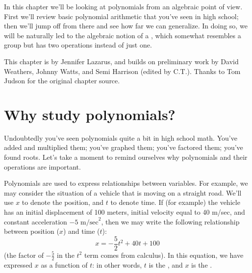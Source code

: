 


 

 In this chapter we'll be looking at  polynomials from an algebraic point of view. First we'll review basic  polynomial arithmetic that you've seen in high school; then we'll jump off from there and see how far we can generalize. In doing so, we will be naturally led to the algebraic notion of a , which somewhat resembles a group but has two operations instead of just one.
\bigskip

This chapter is by Jennifer Lazarus, and builds on preliminary work by David Weathers, Johnny Watts, and Semi Harrison (edited by C.T.). Thanks to Tom Judson for the original chapter source.

\section{Why study polynomials?}
Undoubtedly you've seen polynomials quite a bit in high school math. You've added and multiplied them; you've graphed them; you've factored them; you've found roots. Let's take a moment to remind ourselves why polynomials and their operations are important.	

Polynomials are used to express relationships between variables. For example, we may consider the situation  of a vehicle that is moving on a straight road. We'll use $x$ to denote the position, and $t$ to denote time.   If (for example) the vehicle has an initial displacement of 100 meters, initial velocity equal to 40 m/sec, and constant acceleration $-5$ $\text{m/sec}^2$, then we may write the following relationship between position ($x$) and time ($t$):
$$ x =  -\frac{5}{2} t^2+ 40t + 100$$
(the factor of $-\frac{5}{2}$ in the $t^2$ term comes from calculus). In this equation, we have expressed $x$ as a function of $t$: in other words, $t$ is the , and $x$ is the .

